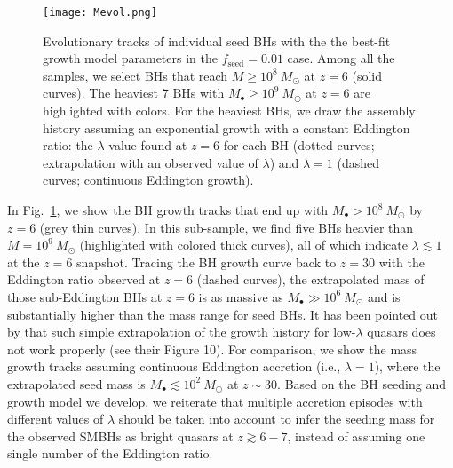 \documentclass[twocolumn, twocolappendix]{aastex63}
\newcommand{\Msun}{M_\odot}
\newcommand{\Mbh}{M_\bullet}
\newcommand{\fseed}{f_\mathrm{seed}}
\newcommand{\red}[1]{\textcolor{red}{ #1}}
\newcommand{\blue}[1]{\textcolor{blue}{ #1}}
\begin{document}
\begin{CJK*}{UTF8}{gbsn}
\begin{figure}
\centering
\texttt{[image: Mevol.png]}
\caption{
Evolutionary tracks of individual seed BHs with the the best-fit growth model parameters in the $\fseed=0.01$ case.
Among all the samples, we select BHs that reach $M\geq 10^8~\Msun$ at $z=6$ (solid curves). 
The heaviest 7 BHs with $M_\bullet \geq 10^9~\Msun$ at $z=6$ are highlighted with colors. 
For the heaviest BHs, we draw the assembly history assuming an exponential growth with a constant Eddington ratio: 
the $\lambda$-value found at $z=6$ for each BH (dotted curves; extrapolation with an observed value of $\lambda$) and 
$\lambda =1$ (dashed curves; continuous Eddington growth).
}
\label{fig:Mevol}
\end{figure}
%
%


In Fig.~\ref{fig:Mevol}, we show the BH growth tracks that end up with $M_\bullet>10^8~\Msun$ by $z=6$ (grey thin curves).
In this sub-sample, we find five BHs heavier than $M=10^9~\Msun$ (highlighted with colored thick curves),
all of which indicate $\lambda \lesssim 1$ at the  $z=6$ snapshot.
Tracing the BH growth curve back to $z=30$ with the Eddington ratio observed at $z=6$ (dashed curves),
the extrapolated mass of those sub-Eddington BHs at $z=6$ is as massive as $\Mbh \gg 10^6~\Msun$ and is 
substantially higher than the mass range for seed BHs.
%
It has been pointed out by \cite{2019ApJ...880...77O} that such simple extrapolation of the growth history for low-$\lambda$ quasars 
does not work properly (see their Figure 10).
For comparison, we show the mass growth tracks assuming continuous Eddington accretion (i.e., $\lambda=1$),
where the extrapolated seed mass is $\Mbh \lesssim 10^2~\Msun$ at $z\sim 30$.
Based on the BH seeding and growth model we develop,
we reiterate that multiple accretion episodes with different values of $\lambda$ should be taken into account 
to infer the seeding mass for the observed SMBHs as bright quasars at $z\gtrsim 6-7$,
instead of assuming one single number of the Eddington ratio.


\end{CJK*}
\end{document}
